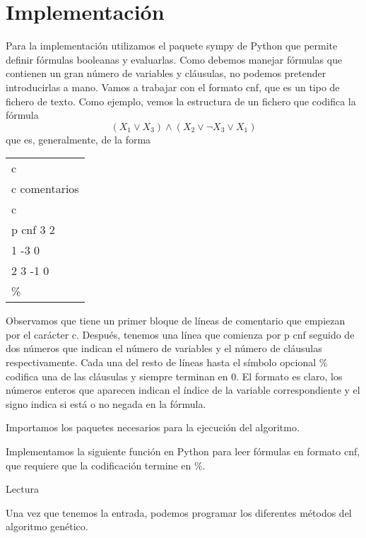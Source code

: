 \documentclass{article}
\theoremstyle{definition}
\newcommand{\cmtt}[1]{{\fontfamily{cmtt}\selectfont #1}}
\newcommand{\code}[1]{}
\begin{document}
\section{Implementación}\label{sec3}
Para la implementación utilizamos el paquete \cmtt{sympy} de Python que permite definir fórmulas booleanas y evaluarlas. Como debemos manejar fórmulas que contienen un gran número de variables y cláusulas, no podemos pretender introducirlas a mano. Vamos a trabajar con el formato \cmtt{cnf}, que es un tipo de fichero de texto. Como ejemplo, vemos la estructura de un fichero que codifica la fórmula 
\[(X_1\lor X_3)\land(X_2\lor\neg X_3\lor X_1)\]
que es, generalmente, de la forma
\begin{center}{\selectfont
\begin{tabular}{l}
c\\
c comentarios\\
c\\
p cnf 3 2\\
1 -3 0\\
2 3 -1 0\\
\%
\end{tabular}}\end{center}
Observamos que tiene un primer bloque de líneas de comentario que empiezan por el carácter \cmtt{c}. Después, tenemos una línea que comienza por \cmtt{p cnf} seguido de dos números que indican el número de variables y el número de cláusulas respectivamente. Cada una del resto de líneas hasta el símbolo opcional \cmtt{\%} codifica una de las cláusulas y siempre terminan en $0$. El formato es claro, los números enteros que aparecen indican el índice de la variable correspondiente y el signo indica si está o no negada en la fórmula.

Importamos los paquetes necesarios para la ejecución del algoritmo.
\code{paquetes.txt}
Implementamos la siguiente función en Python para leer fórmulas en formato \cmtt{cnf}, que requiere que la codificación termine en $\%$.
\begin{description}
    \item[Lectura]\leavevmode
        \code{lectura.txt}
\end{description}

Una vez que tenemos la entrada, podemos programar los diferentes métodos del algoritmo genético.
\end{document}
